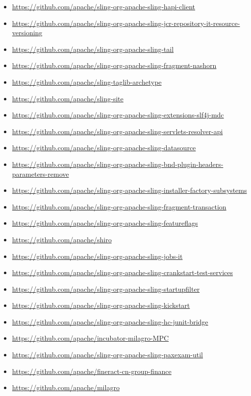 \documentclass[sigconf]{acmart}
\begin{document}
\begin{itemize}
  \item \url{https://github.com/apache/sling-org-apache-sling-hapi-client}
  \item \url{https://github.com/apache/sling-org-apache-sling-jcr-repository-it-resource-versioning}
  \item \url{https://github.com/apache/sling-org-apache-sling-tail}
  \item \url{https://github.com/apache/sling-org-apache-sling-fragment-nashorn}
  \item \url{https://github.com/apache/sling-taglib-archetype}
  \item \url{https://github.com/apache/sling-site}
  \item \url{https://github.com/apache/sling-org-apache-sling-extensions-slf4j-mdc}
  \item \url{https://github.com/apache/sling-org-apache-sling-servlets-resolver-api}
  \item \url{https://github.com/apache/sling-org-apache-sling-datasource}
  \item \url{https://github.com/apache/sling-org-apache-sling-bnd-plugin-headers-parameters-remove}
  \item \url{https://github.com/apache/sling-org-apache-sling-installer-factory-subsystems}
  \item \url{https://github.com/apache/sling-org-apache-sling-fragment-transaction}
  \item \url{https://github.com/apache/sling-org-apache-sling-featureflags}
  \item \url{https://github.com/apache/shiro}
  \item \url{https://github.com/apache/sling-org-apache-sling-jobs-it}
  \item \url{https://github.com/apache/sling-org-apache-sling-crankstart-test-services}
  \item \url{https://github.com/apache/sling-org-apache-sling-startupfilter}
  \item \url{https://github.com/apache/sling-org-apache-sling-kickstart}
  \item \url{https://github.com/apache/sling-org-apache-sling-hc-junit-bridge}
  \item \url{https://github.com/apache/incubator-milagro-MPC}
  \item \url{https://github.com/apache/sling-org-apache-sling-paxexam-util}
  \item \url{https://github.com/apache/fineract-cn-group-finance}
  \item \url{https://github.com/apache/milagro}

\end{itemize}
\end{document}
